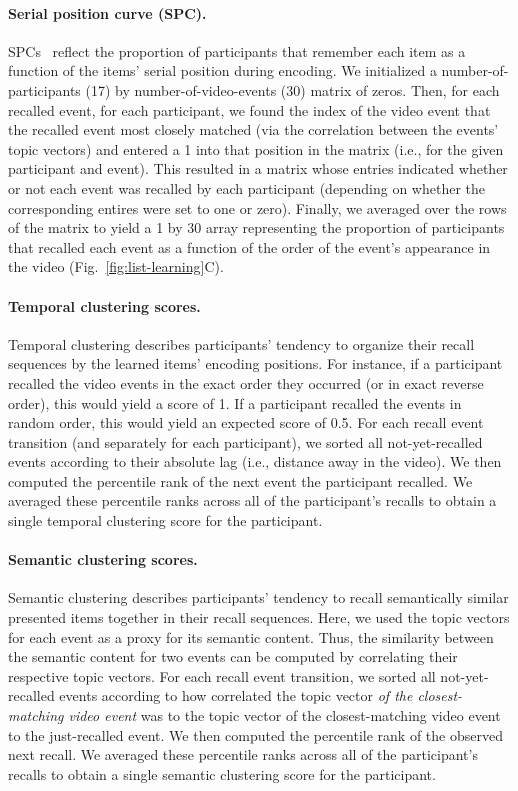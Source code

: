 \documentclass{article}
\begin{document}
\paragraph{Serial position curve (SPC).} SPCs~\citep{Murd62a} reflect the proportion of participants that remember each item as a function of the items' serial position during encoding. We initialized a number-of-participants (17) by number-of-video-events (30) matrix of zeros. Then, for each recalled event, for each participant, we found the index of the video event that the recalled event most closely matched (via the correlation between the events' topic vectors) and entered a 1 into that position in the matrix (i.e., for the given participant and event). This resulted in a matrix whose entries indicated whether or not each event was recalled by each participant (depending on whether the corresponding entires were set to one or zero).  Finally, we averaged over the rows of the matrix to yield a 1 by 30 array representing the proportion of participants that recalled each event as a function of the order of the event's appearance in the video (Fig.~\ref{fig:list-learning}C).

\paragraph{Temporal clustering scores.} Temporal clustering describes participants' tendency to organize their recall sequences by the learned items' encoding positions.  For instance, if a participant recalled the video events in the exact order they occurred (or in exact reverse order), this would yield a score of 1.  If a participant recalled the events in random order, this would yield an expected score of 0.5.  For each recall event transition (and separately for each participant), we sorted all not-yet-recalled events according to their absolute lag (i.e., distance away in the video).  We then computed the percentile rank of the next event the participant recalled.  We averaged these percentile ranks across all of the participant's recalls to obtain a single temporal clustering score for the participant.

\paragraph{Semantic clustering scores.} Semantic clustering describes participants' tendency to recall semantically similar presented items together in their recall sequences.  Here, we used the topic vectors for each event as a proxy for its semantic content. Thus, the similarity between the semantic content for two events can be computed by correlating their respective topic vectors.  For each recall event transition, we sorted all not-yet-recalled events according to how correlated the topic vector \textit{of the closest-matching video event} was to the topic vector of the closest-matching video event to the just-recalled event.  We then computed the percentile rank of the observed next recall.  We averaged these percentile ranks across all of the participant's recalls to obtain a single semantic clustering score for the participant.
\end{document}
